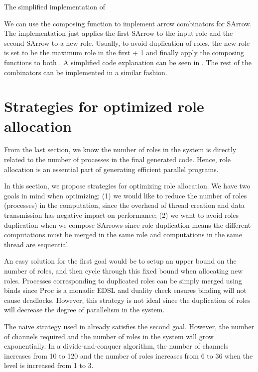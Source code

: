 \begin{listing}
\inputminted{Haskell}{arrow/impl.hs}
\caption{The simplified implementation of \hask{>>>}}
\label{SArrow:code:impl}
\end{listing}

We can use the  composing function to implement arrow combinators for SArrow. The implementation just applies the first SArrow to the input role and the second SArrow to a new role. Usually, to avoid duplication of roles, the new role is set to be the maximum role in the first  + 1 and finally apply the  composing functions to both . A simplified code explanation can be seen in . The rest of the combinators can be implemented in a similar fashion.

\section{Strategies for optimized role allocation} \label{SArrow:roleAllc}
From the last section, we know the number of roles in the system is directly related to the number of processes in the final generated code. Hence, role allocation is an essential part of generating efficient parallel programs. 

In this section, we propose strategies for optimizing role allocation. We have two goals in mind when optimizing; (1) we would like to reduce the number of roles (processes) in the computation, since the overhead of thread creation and data transmission has negative impact on performance; (2) we want to avoid roles duplication when we compose SArrows since role duplication means the different computations must be merged in the same role and computations in the same thread are sequential.

An easy solution for the first goal would be to setup an upper bound on the number of roles, and then cycle through this fixed bound when allocating new roles. Processes corresponding to duplicated roles can be simply merged using binds since Proc is a monadic EDSL and duality check ensures binding will not cause deadlocks. However, this strategy is not ideal since the duplication of roles will decrease the degree of parallelism in the system.

The naive strategy used in  already satisfies the second goal. However, the number of channels required and the number of roles in the system will grow exponentially. In a divide-and-conquer algorithm, the number of channels increases from 10 to 120 and the number of roles increases from 6 to 36 when the level is increased from 1 to 3.

